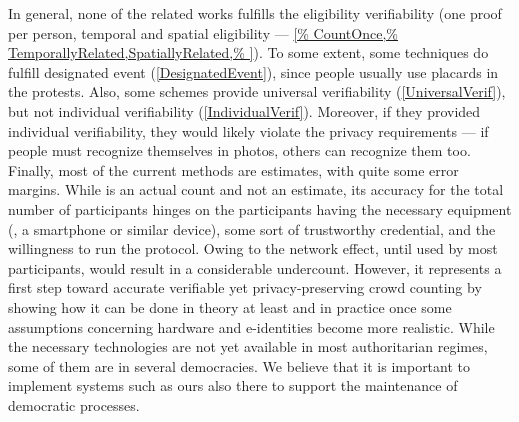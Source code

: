 In general, none of the related works fulfills the eligibility
verifiability (one proof per person, temporal and spatial eligibility ---
\cref{%
  CountOnce,%
  TemporallyRelated,SpatiallyRelated,%
}).
To some extent, some techniques do fulfill designated event (\cref{DesignatedEvent}), since people usually use placards in the protests.
Also, some schemes provide universal verifiability (\cref{UniversalVerif}), but not individual verifiability (\cref{IndividualVerif}).
Moreover, if they provided individual verifiability, they would likely violate 
the privacy requirements --- if people must recognize themselves in photos, 
others can recognize them too.
Finally, most of the current methods are estimates, with quite some error margins. 
While \CROCUS is an actual count and not an estimate, its accuracy for the total number of participants hinges on the participants having the necessary equipment (\ie, a smartphone or similar device), some sort of trustworthy credential, and the willingness to run the protocol. 
Owing to the network effect, until used by most participants, \CROCUS would result in a considerable undercount. 
However, it represents a first step toward accurate verifiable yet privacy-preserving crowd counting by showing how it can be done in theory at least and in practice once some assumptions concerning hardware and e-identities become more realistic. 
While the necessary technologies are not yet available in most authoritarian regimes, some of them are in several democracies. We believe that it is important to implement systems such as ours also there to support the maintenance of democratic processes.


